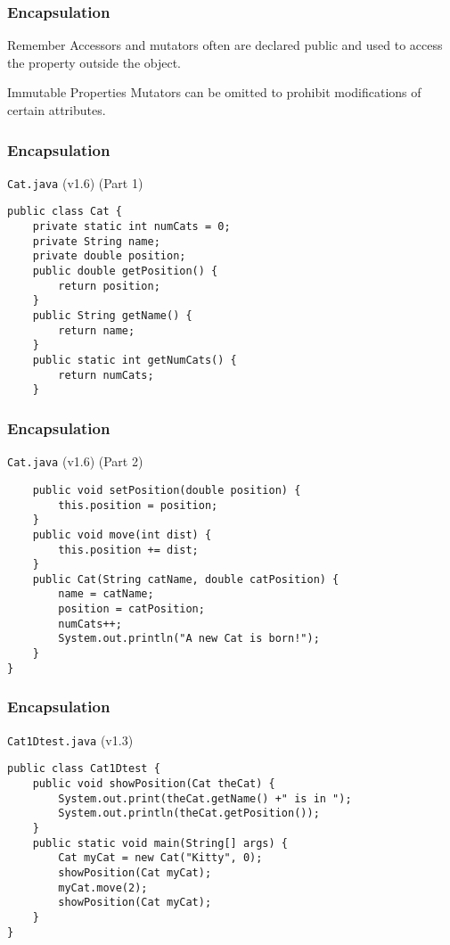 \documentclass[10pt, compress]{beamer}
\begin{document}
\begin{frame}[fragile]
	\frametitle{Encapsulation}
	\begin{block}{Remember}
	Accessors and mutators often are declared public and used to access the property outside the object.
	\end{block}
	\begin{block}{Immutable Properties}
	Mutators can be omitted to prohibit modifications of certain attributes.
	\end{block}
\end{frame}

\begin{frame}[fragile]
	\frametitle{Encapsulation}
	\begin{block}{\texttt{Cat.java} (v1.6) (Part 1)}
		\begin{verbatim}
public class Cat {
	private static int numCats = 0;
	private String name;
	private double position;
	public double getPosition() {
		return position;
	}
	public String getName() {
		return name;
	}
	public static int getNumCats() {
		return numCats;
	}
		\end{verbatim}
	\end{block}
\end{frame}

\begin{frame}[fragile]
	\frametitle{Encapsulation}
	\begin{block}{\texttt{Cat.java} (v1.6) (Part 2)}
		\begin{verbatim}
	public void setPosition(double position) {
		this.position = position;
	}
	public void move(int dist) {
		this.position += dist;
	}
	public Cat(String catName, double catPosition) {
		name = catName;
		position = catPosition;
		numCats++;
		System.out.println("A new Cat is born!");
	}
}
		\end{verbatim}
	\end{block}
\end{frame}

\begin{frame}[fragile]
	\frametitle{Encapsulation}
	\begin{block}{\texttt{Cat1Dtest.java} (v1.3)}
		\begin{verbatim}
public class Cat1Dtest {
	public void showPosition(Cat theCat) {
		System.out.print(theCat.getName() +" is in ");
		System.out.println(theCat.getPosition());
	}
	public static void main(String[] args) {
		Cat myCat = new Cat("Kitty", 0);
		showPosition(Cat myCat);
		myCat.move(2);
		showPosition(Cat myCat);
	}
}
		\end{verbatim}
	\end{block}
\end{frame}

\end{document}
